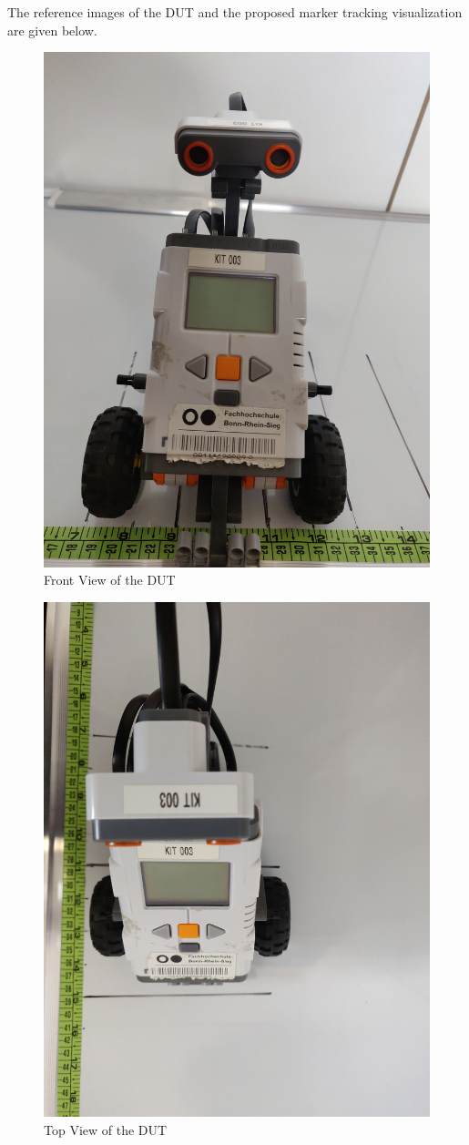 \documentclass[10pt,a4paper]{article}
\begin{document}
\begin{enumerate}[label=\Roman*]
The reference images of the DUT and the proposed marker tracking visualization are given below.

\begin{figure}[h]
	\centering
\includegraphics[width=0.7\linewidth, angle = -90 ]{Front_view}
\caption{ Front View of the DUT}
\end{figure}

\begin{figure}[h]
	\centering
	\includegraphics[width=0.7\linewidth, angle = -90]{Top_view}
	\caption{ Top View of the DUT}
\end{figure}


\end{enumerate}
\end{document}
